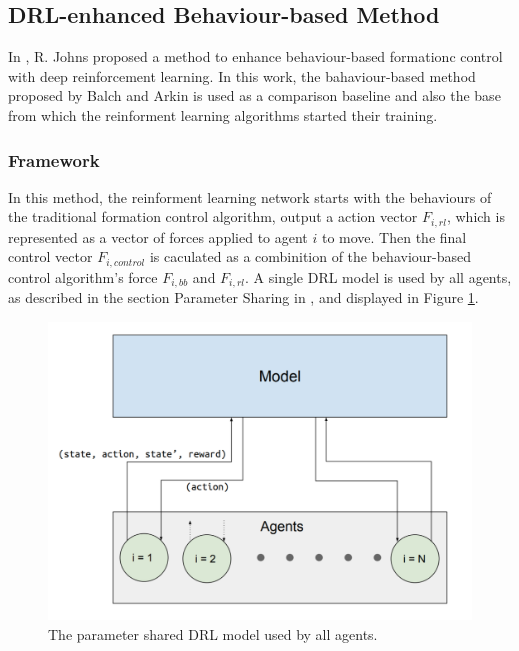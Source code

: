 \subsection{DRL-enhanced Behaviour-based Method}

In \cite{johns2018intelligent}, R. Johns proposed a method to enhance behaviour-based formationc control with deep reinforcement learning.
In this work, the bahaviour-based method proposed by Balch and Arkin \cite{balch1998behavior} is used as a comparison baseline and also the base from which the reinforment learning algorithms started their training. 

\subsubsection{Framework}

In this method, the reinforment learning network starts with the behaviours of the traditional formation control algorithm, output a action vector $F_{i,rl}$, which is represented as a vector of forces applied to agent $i$ to move.
Then the final control vector $F_{i,control}$ is caculated as a combinition of the behaviour-based control algorithm's force $F_{i,bb}$ and $F_{i,rl}$. 
A single DRL model is used by all agents, as described in the section Parameter Sharing in \cite{johns2018intelligent}, and displayed in Figure \ref{fig:drlbbmparamsharing}.

\begin{figure}
	\centering
	\includegraphics[width=5in]{drlbbmparamsharing.png}
	\caption{The parameter shared DRL model used by all agents.}
	\label{fig:drlbbmparamsharing} 
\end{figure}

